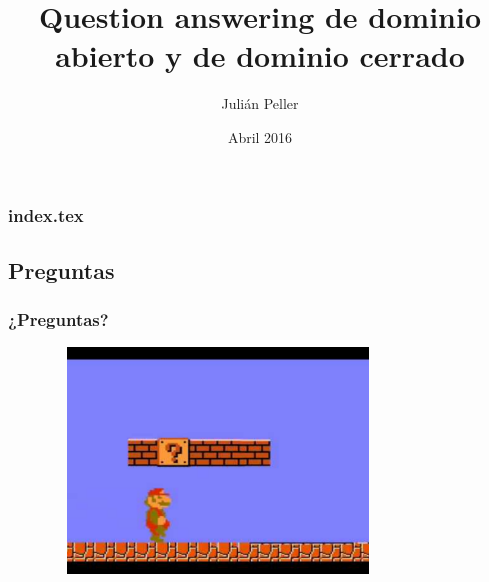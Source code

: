\documentclass{beamer}
\title{Question answering de dominio abierto y de dominio cerrado}
\author{Julián Peller}
\date{Abril 2016} %
\begin{document}
\begin{frame}
  \titlepage
\end{frame}

\begin{frame}
  \frametitle{index.tex}
  \tableofcontents
\end{frame}








  \subsection*{Preguntas}
  \begin{frame}
    \frametitle{¿Preguntas?}
      \begin{figure}
        \includegraphics[width=9cm,height=6cm]{graficos/qmark2.pdf}
      \end{figure}
    \end{frame}
\end{document}
